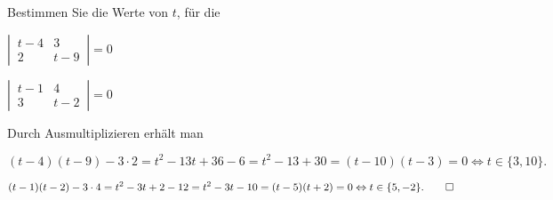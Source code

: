 Bestimmen Sie die Werte von $t$, für die
\begin{teilaufgaben}
\item
$
\left|\,\begin{matrix}
t-4&3\\2&t-9
\end{matrix}\,\right|=0
$
\item
$
\left|\,\begin{matrix}
t-1&4\\3&t-2
\end{matrix}\,\right|=0
$
\end{teilaufgaben}

\begin{loesung}
Durch Ausmultiplizieren erhält man
\begin{teilaufgaben}
\item
\[
(t-4)(t-9)-3\cdot 2=t^2 -13t +36-6=t^2-13+30=(t-10)(t-3)=0\Leftrightarrow t\in\{3,10\}.
\]
\item
\[
(t-1)(t-2)-3\cdot 4=t^2-3t+2-12=t^2-3t-10=(t-5)(t+2)=0\Leftrightarrow t\in\{5,-2\}.
\qedhere
\]
\end{teilaufgaben}
\end{loesung}


